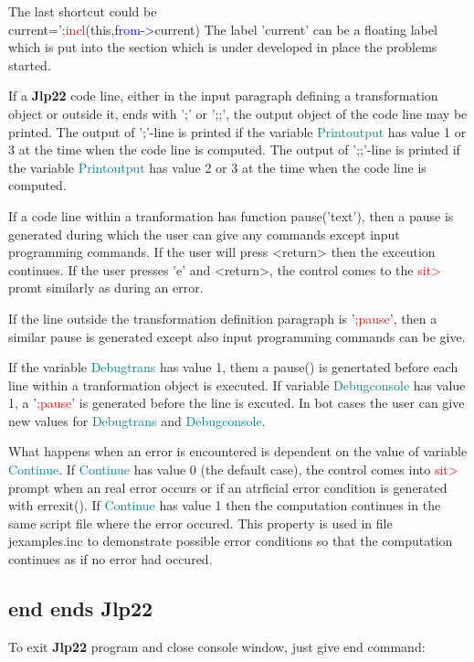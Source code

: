 {\begin{itemize}
\begin{itemize}
The last shortcut could be \\ 
current='\textcolor{Red}{;incl}(this,\textcolor{blue}{from->}current) 
The label 'current' can be a floating label which is put into the section which is under developed 
in place the problems started. 
 
If a \textbf{Jlp22} code line, either in the input paragraph defining a transformation object 
or outside it, ends with ';' or ';;', the output object of the code line may be printed. 
The output of ';'-line is printed if the variable \textcolor{teal}{Printoutput} has value 1 or 3 at the time when the 
code line is computed. 
The output of ';;'-line is printed if the variable \textcolor{teal}{Printoutput} has value 2 or 3 at the time when the 
code line is computed. 
 
If a code line within a tranformation has function \textcolor{VioletRed}{pause}('text'), then a pause is generated during which 
the user can give any commands except 
input programming commands. If the user will press <return> then the exceution continues. If the user 
presses 'e' and <return>, the control comes to the \textcolor{Red}{sit>} promt similarly as during an error. 
 
If the line outside the transformation definition paragraph is '\textcolor{Red}{;pause}', then 
a similar pause is generated except also input programming commands can be give. 
 
If the variable \textcolor{teal}{Debugtrans} has value 1, them a \textcolor{VioletRed}{pause}() is genertated before each line within 
a tranformation object is executed.  If variable \textcolor{teal}{Debugconsole} has value 1, 
a '\textcolor{Red}{;pause}' is generated before  the line is excuted. In bot cases the user can 
give new values for \textcolor{teal}{Debugtrans} and \textcolor{teal}{Debugconsole}. 
 
What happens when an error is encountered is dependent on the value of variable \textcolor{teal}{Continue}. If \textcolor{teal}{Continue} has 
value 0 (the default case), the control comes into \textcolor{Red}{sit>} prompt when an real error occurs or if an atrficial 
error condition is generated with \textcolor{VioletRed}{errexit}(). If \textcolor{teal}{Continue} has value 1 then the computation continues in 
the same script file where the error occured. This property is used in file jexamples.inc to demonstrate 
possible error conditions so that the computation continues as if no error had occured. 
 
 
\subsection{end ends \textbf{Jlp22}} 
\label{exit} 
To exit \textbf{Jlp22} program and close console window, just give end command: 
 

\end{itemize}
\end{itemize}}
